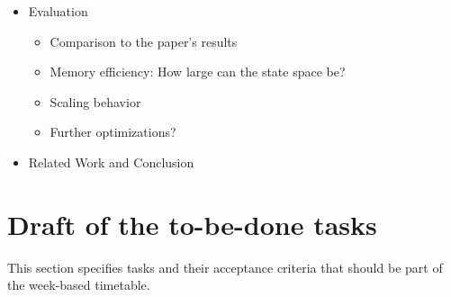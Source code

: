 \documentclass[a4paper]{scrartcl}
\begin{document}
\begin{itemize}
    \item Evaluation
          \begin{itemize}
              \item Comparison to the paper's results
              \item Memory efficiency: How large can the state space be?
              \item Scaling behavior
              \item Further optimizations?
          \end{itemize}
    \item Related Work and Conclusion
\end{itemize}


\section{Draft of the to-be-done tasks}

This section specifies tasks and their acceptance criteria that should be part of the week-based timetable.
\end{document}
